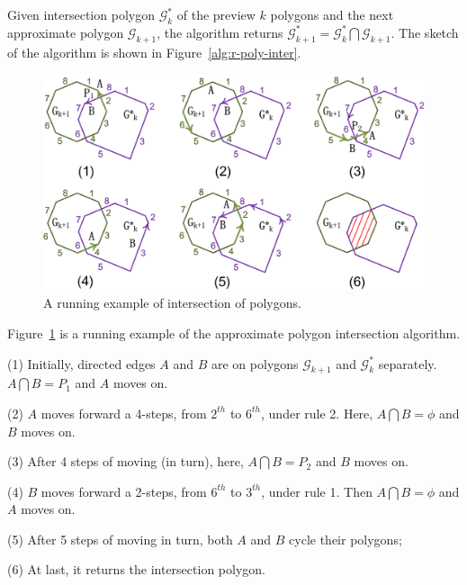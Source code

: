 \stitle{\textcolor[rgb]{0.00,0.07,1.00}{Regular polygon intersection algorithm}}
Given intersection polygon $\mathcal{G}^*_k$ of the preview $k$ polygons and the next approximate polygon $\mathcal{G}_{k+1}$, the algorithm returns $\mathcal{G}^*_{k+1} = \mathcal{G}^*_k  \bigcap \mathcal{G}_{k+1}$.
The sketch of the algorithm is shown in Figure~\ref{alg:r-poly-inter}.







\begin{figure}[tb!]
\centering
\includegraphics[scale=0.88]{figures/Fig-r-poly-inter.png}
\vspace{-1ex}
\caption{\small A running example of intersection of polygons.}
\vspace{-2ex}
\label{fig:r-poly-inter}
\end{figure}




\begin{example}
Figure~\ref{fig:r-poly-inter} is a running example of the approximate polygon intersection algorithm.

\ni (1) Initially, directed edges $A$ and $B$ are on polygons $\mathcal{G}_{k+1}$ and $\mathcal{G}^*_{k}$ separately. $A \bigcap B = P_1$ and $A$ moves on.

\ni (2) $A$ moves forward a 4-steps, from $2^{th}$ to $6^{th}$, under rule 2. Here, $A \bigcap B = \phi$ and $B$ moves on.

\ni (3) After 4 steps of moving (in turn), here, $A \bigcap B = P_2$ and $B$ moves on.

\ni (4) $B$ moves forward a 2-steps, from $6^{th}$ to $3^{th}$, under rule 1. Then $A \bigcap B = \phi$ and $A$ moves on.

\ni (5) After 5 steps of moving in turn, both $A$ and $B$ cycle their polygons;

\ni (6) At last, it returns the intersection polygon.
\end{example}






